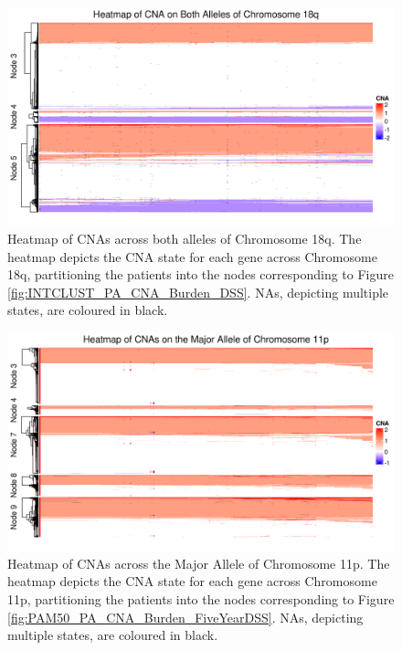 \begin{figure}[!htb]
\centering
\includegraphics[width = 1\textwidth]{../figures/Chapter_6/Heatmap_Chr18q_Genes_Both_Alleles.png}
\caption[Heatmap of CNAs across both alleles of Chromosome 18q]{Heatmap of CNAs across both alleles of Chromosome 18q. The heatmap depicts the CNA state for each gene across Chromosome 18q, partitioning the patients into the nodes corresponding to Figure \ref{fig:INTCLUST_PA_CNA_Burden_DSS}. NAs, depicting multiple states, are coloured in black.}
\label{fig:heatmap_Both_18q}
\end{figure}

\begin{figure}[!htb]
\centering
\includegraphics[width = 1\textwidth]{../figures/Chapter_6/Heatmap_Chr11p_Genes_Major.png}
\caption[Heatmap of CNAs across the Major Allele of Chromosome 11p]{Heatmap of CNAs across the Major Allele of Chromosome 11p. The heatmap depicts the CNA state for each gene across Chromosome 11p, partitioning the patients into the nodes corresponding to Figure \ref{fig:PAM50_PA_CNA_Burden_FiveYearDSS}. NAs, depicting multiple states, are coloured in black.}
\label{fig:heatmap_Major_11p}
\end{figure}

